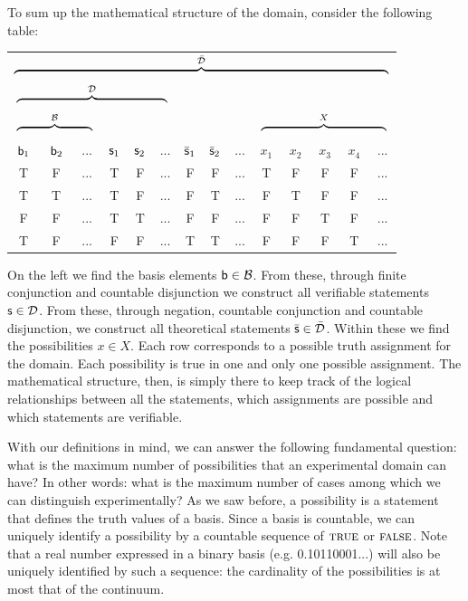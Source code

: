 	To sum up the mathematical structure of the domain, consider the following table:
	\begin{center}
		\begin{tabular}{c|c|c|c|c|c|c|c|c|c|c|c|c|c}
			\multicolumn{14}{c}{$\overbrace{\rule{10.4cm}{0pt}}^{\tdomain}$} \\		\multicolumn{6}{c|}{$\overbrace{\rule{4.2cm}{0pt}}^{\edomain}$} & \multicolumn{6}{c}{}  \\		\multicolumn{3}{c|}{$\overbrace{\rule{2.1cm}{0pt}}^{\basis}$} & \multicolumn{3}{c|}{} & \multicolumn{3}{c|}{} & \multicolumn{5}{c}{$\overbrace{\rule{3.5cm}{0pt}}^{X}$} \\
			$\stmt[b]_1$ & $\stmt[b]_2$ & ... & $\stmt_1$ & $\stmt_2$ & ... & $\bar{\stmt}_1$ & $\bar{\stmt}_2$ & ... & $x_1$ & $x_2$ & $x_3$ &$x_4$ & ... \\
			\hline
			T & F & ... & T & F & ... & F & F & ... & T & F & F & F & ... \\
			T & T & ... & T & F & ... & F & T & ... & F & T & F & F & ... \\
			F & F & ... & T & T & ... & F & F & ... & F & F & T & F & ... \\
			T & F & ... & F & F & ... & T & T & ... & F & F & F & T & ... \\
		\end{tabular}
	\end{center}
	On the left we find the basis elements $\stmt[b] \in \basis$. From these, through finite conjunction and countable disjunction we construct all verifiable statements $\stmt \in \edomain$. From these, through negation, countable conjunction and countable disjunction, we construct all theoretical statements $\bar{\stmt} \in \tdomain$. Within these we find the possibilities $x \in X$. Each row corresponds to a possible truth assignment for the domain. Each possibility is true in one and only one possible assignment. The mathematical structure, then, is simply there to keep track of the logical relationships between all the statements, which assignments are possible and which statements are verifiable.
	
	With our definitions in mind, we can answer the following fundamental question: what is the maximum number of possibilities that an experimental domain can have? In other words: what is the maximum number of cases among which we can distinguish experimentally? As we saw before, a possibility is a statement that defines the truth values of a basis. Since a basis is countable, we can uniquely identify a possibility by a countable sequence of $\TRUE$ or $\FALSE$. Note that a real number expressed in a binary basis (e.g. 0.10110001...) will also be uniquely identified by such a sequence: the cardinality of the possibilities is at most that of the continuum.
	
